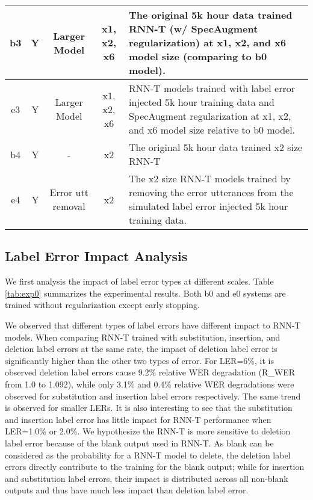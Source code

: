 \documentclass{article}
\begin{document}
\begin{table*}[t]
\begin{tabular}{|c|c|c|c|p{10cm}|}
  b3                     & Y            & Larger Model             & x1, x2, x6          & The original 5k hour data trained RNN-T (w/ SpecAugment regularization) at x1, x2, and x6 model size (comparing to b0 model). \\ \hline
  e3                     & Y            & Larger Model             & x1, x2, x6          & RNN-T models trained with label error injected 5k hour training data and SpecAugment regularization at x1, x2, and x6 model size relative to b0 model. \\ \hline
  b4                     & Y            & \multicolumn{1}{c|}{-}   & x2                  & The original 5k hour data trained x2 size RNN-T \\ \hline
  e4                     & Y            & Error utt removal        & x2                  & The x2 size RNN-T models trained by removing the error utterances from the simulated label error injected 5k hour training data. \\ \hline
\end{tabular}
\end{table*}

\subsection{Label Error Impact Analysis} \label{label_error_analysis}
We first analysis the impact of label error types at different scales. Table \ref{tab:exp0} summarizes the experimental results. Both b0 and e0 systems are trained without regularization except early stopping.

We observed that different types of label errors have different impact to RNN-T models. When comparing RNN-T trained with substitution, insertion, and deletion label errors at the same rate, the impact of deletion label error is significantly higher than the other two types of error. For LER=6\%, it is observed deletion label errors cause 9.2\% relative WER degradation (R\_WER from 1.0 to 1.092), while only 3.1\% and 0.4\% relative WER degradations were observed for substitution and insertion label errors respectively. The same trend is observed for smaller LERs. It is also interesting to see that the substitution and insertion label error has little impact for RNN-T performance when LER=1.0\% or 2.0\%. We hypothesize the RNN-T is more sensitive to deletion label error because of the blank output used in RNN-T. As blank can be considered as the probability for a RNN-T model to delete, the deletion label errors directly contribute to the training for the blank output; while for insertion and substitution label errors, their impact is distributed across all non-blank outputs and thus have much less impact than deletion label error.
 
\end{document}
